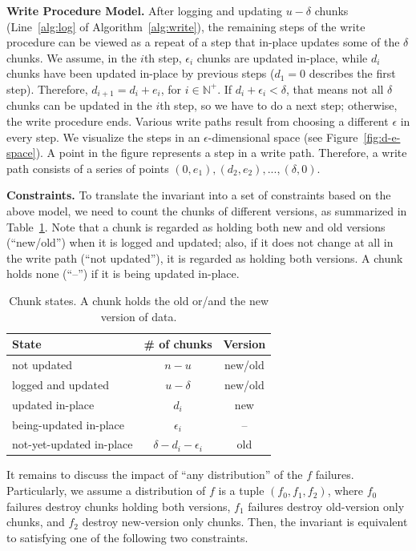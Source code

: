 \noindent
\textbf{Write Procedure Model.} After logging and updating $u - \delta$ chunks (Line~\ref{alg:log} of Algorithm~\ref{alg:write}),
the remaining steps of the write procedure can be viewed as a repeat of a step that in-place updates some of the
$\delta$ chunks. We assume, in the $i$th step, $\epsilon_i$ chunks are
updated in-place, while $d_i$ chunks have been updated in-place by previous
steps ($d_1=0$ describes the first step).  Therefore, $d_{i+1} = d_i + e_i$,
for $i \in \mathbb{N}^{+}$. If $d_i + \epsilon_i < \delta$, that means not all
$\delta$ chunks can be updated in the $i$th step, so we have to do a next step;
otherwise, the write procedure ends. Various write paths result from choosing a
different $\epsilon$ in every step.  We visualize the steps in an $\epsilon$-dimensional
space (see Figure~\ref{fig:d-e-space}). A point in the figure represents a
step in a write path. Therefore, a write path consists of a series of points
$(0, e_1), (d_2, e_2), ..., (\delta, 0)$.

\noindent
\textbf{Constraints.} To translate the invariant into a set of constraints
based on the above model, we need to count the chunks of different versions,
as summarized in Table~\ref{tab:states}.
Note that a chunk is regarded as holding both new and old versions (``new/old'') when it is logged and updated; also, if it does not change at all in the write
path (``not updated''), it is regarded as holding both versions. A chunk
holds none (``--'') if it is being updated in-place.

\begin{table}[!b]
\centering
\begin{tabular}{l|c|c}
\hline
State & \# of chunks & Version \\
\hline
not updated & $n - u$ & new/old \\
logged and updated & $u - \delta$ & new/old \\
updated in-place & $d_i$ & new \\
being-updated in-place & $\epsilon_i$ & -- \\
not-yet-updated in-place & $\delta - d_i - \epsilon_i$ & old \\
\hline
\end{tabular}
\caption{Chunk states. A chunk holds the old or/and the new version of data.  }
\label{tab:states}
\end{table}

It remains to discuss the impact of ``any distribution'' of the $f$ failures.
Particularly, we assume a distribution of $f$ is a tuple $(f_0, f_1, f_2)$, where $f_0$ failures destroy
chunks holding both versions, $f_1$ failures destroy old-version only chunks,
and $f_2$ destroy new-version only chunks. Then, the invariant is equivalent to
satisfying one of the following two constraints.

